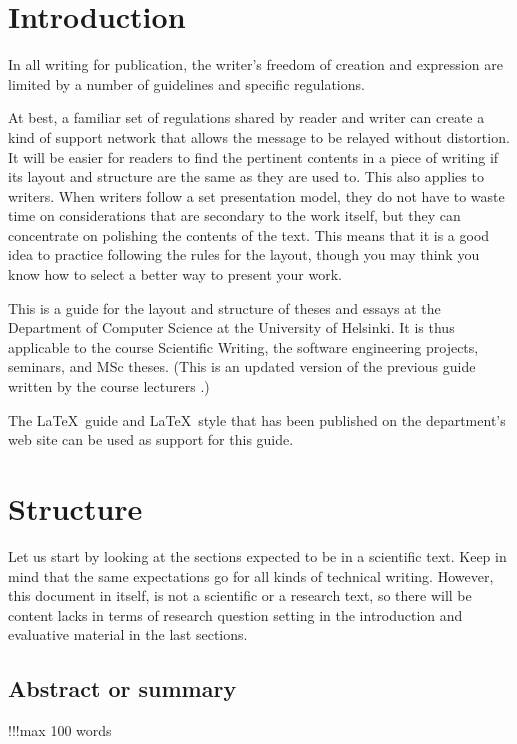 \chapter{Introduction}

In all writing for publication, the writer's freedom of creation and expression are limited by a number of guidelines and specific regulations.

At best, a familiar set of regulations shared by reader and writer can create a kind of support network that allows the message to be relayed without distortion. It will be easier for readers to find 
the pertinent contents in a piece of writing if its layout and structure are the same as they are used to. This also applies to writers. When writers follow a set presentation model, 
they do not have to waste time on considerations that are secondary to the work itself, but they can concentrate on polishing the contents of the text. This means that it is a good 
idea to practice following the rules for the layout, though you may think you know how to select a better way to present your work.

This is a guide for the layout and structure of theses and essays at the Department of Computer Science at the University of Helsinki. It is thus applicable to the course 
Scientific Writing, the software engineering projects, seminars, and MSc theses. (This is an updated version of 
the previous guide written by the course lecturers \citep{erkio01, erkiomakela96, erkio94, verkamo92}.)

The \LaTeX\ guide and \LaTeX\ style that has been  published on the department's web site can be used as support for this guide.


\chapter{Structure}

Let us start by looking at the sections expected to be in a scientific text. Keep in mind that the same expectations go for all kinds of technical writing.
However, this document in itself, is not a scientific or a research
text, so there will be content lacks in terms of research question
setting in the introduction and evaluative material in the last sections.

\section{Abstract or summary}
!!!max 100 words

